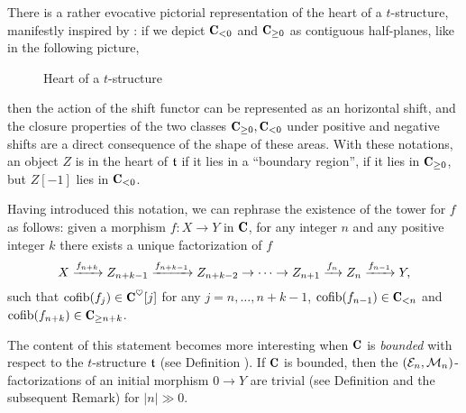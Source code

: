 \documentclass[a4paper,12pt]{amsart}
\begin{document}
\begin{remark}\label{evocative}
There is a rather evocative pictorial representation of the heart of a $t$-structure, manifestly inspired by \cite{Brid}:
 if we depict $\C_{<0}$ and $\C_{\geq 0}$ as contiguous half-planes, like in the following picture,
\begin{center}
\begin{figure}[h]
\caption{Heart of a $t$-structure}
\end{figure}
\end{center}
then the action of the shift functor can be represented as an horizontal shift, and the closure properties of the two classes $\C_{\geq 0},\C_{<0}$ under positive and negative shifts are a direct consequence of the shape of these areas. With these notations, an object $Z$ is in the heart of $\mathfrak{t}$ if it lies in a ``boundary region'', \ie if it lies in $\C_{\geq 0}$, but $Z[-1]$ lies in $\C_{<0}$.
\end{remark}
Having introduced this notation, we can rephrase the existence of the tower for $f$ as follows: given a morphism  $f\colon X\to Y$  in $\C$, for any integer $n$ and any positive integer $k$ there exists a unique factorization of $f$ 
\[
X \xrightarrow{f_{n+k}} Z_{n+k-1} \xrightarrow{f_{n+k-1}}Z_{n+k-2}\to\dots\to Z_{n+1} \xrightarrow{f_{n}} Z_{n} \xrightarrow{f_{n-1}} Y,
\]
such that
$\cofib(f_j)\in \C^\heart[j]$ for any $j=n,\dots,n+k-1$,  $\cofib(f_{n-1})\in \C_{<n}$  and $\cofib(f_{n+k})\in \C_{\geq n+k}$. 


The content of this statement becomes more interesting when $\C$ is \emph{bounded} with respect to the $t$-structure $\mathfrak{t}$ (see Definition ). If $\C$ is bounded, then the $(\mathcal{E}_n,\mathcal{M}_n)$-factorizations of an initial morphism $0\to Y$ are trivial (see Definition  and the subsequent Remark) for $|n|\gg 0$. 
\end{document}
